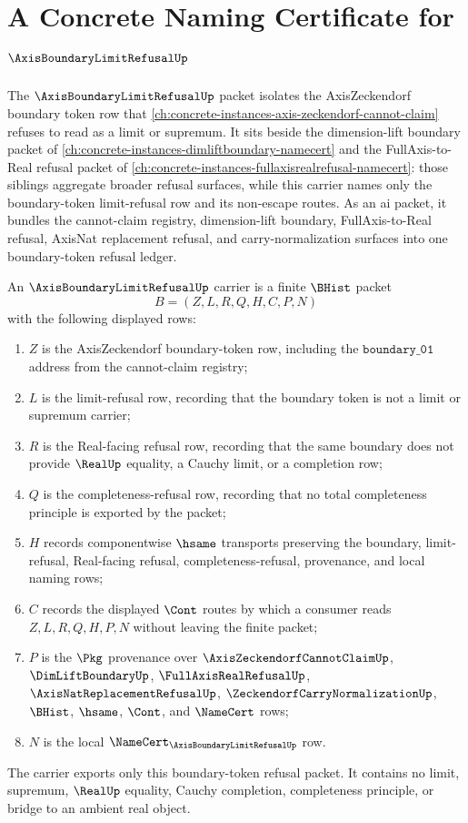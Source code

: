 \chapter{A Concrete Naming Certificate for $\AxisBoundaryLimitRefusalUp$}
\label{ch:concrete-instances-axis-boundary-limit-refusal-namecert}

The $\AxisBoundaryLimitRefusalUp$ packet isolates the AxisZeckendorf boundary
token row that \autoref{ch:concrete-instances-axis-zeckendorf-cannot-claim}
refuses to read as a limit or supremum. It sits beside the dimension-lift
boundary packet of \autoref{ch:concrete-instances-dimliftboundary-namecert}
and the FullAxis-to-Real refusal packet of
\autoref{ch:concrete-instances-fullaxisrealrefusal-namecert}: those siblings
aggregate broader refusal surfaces, while this carrier names only the
boundary-token limit-refusal row and its non-escape routes.
As an ai packet, it bundles the cannot-claim registry,
dimension-lift boundary, FullAxis-to-Real refusal, AxisNat replacement
refusal, and carry-normalization surfaces into one boundary-token refusal
ledger.

\begin{definition}
\label{def:axis-boundary-limit-refusal-carrier}
An $\AxisBoundaryLimitRefusalUp$ carrier is a finite $\BHist$ packet
$$
B=(Z,L,R,Q,H,C,P,N)
$$
with the following displayed rows:
\begin{enumerate}
\item $Z$ is the AxisZeckendorf boundary-token row, including the
$\mathtt{boundary\_01}$ address from the cannot-claim registry;
\item $L$ is the limit-refusal row, recording that the boundary token is not a
limit or supremum carrier;
\item $R$ is the Real-facing refusal row, recording that the same boundary
does not provide $\RealUp$ equality, a Cauchy limit, or a completion row;
\item $Q$ is the completeness-refusal row, recording that no total completeness
principle is exported by the packet;
\item $H$ records componentwise $\hsame$ transports preserving the boundary,
limit-refusal, Real-facing refusal, completeness-refusal, provenance, and
local naming rows;
\item $C$ records the displayed $\Cont$ routes by which a consumer reads
$Z,L,R,Q,H,P,N$ without leaving the finite packet;
\item $P$ is the $\Pkg$ provenance over $\AxisZeckendorfCannotClaimUp$,
$\DimLiftBoundaryUp$, $\FullAxisRealRefusalUp$, $\AxisNatReplacementRefusalUp$,
$\ZeckendorfCarryNormalizationUp$, $\BHist$, $\hsame$, $\Cont$, and
$\NameCert$ rows;
\item $N$ is the local $\NameCert_{\AxisBoundaryLimitRefusalUp}$ row.
\end{enumerate}
The carrier exports only this boundary-token refusal packet. It contains no
limit, supremum, $\RealUp$ equality, Cauchy completion, completeness principle,
or bridge to an ambient real object.
\end{definition}

